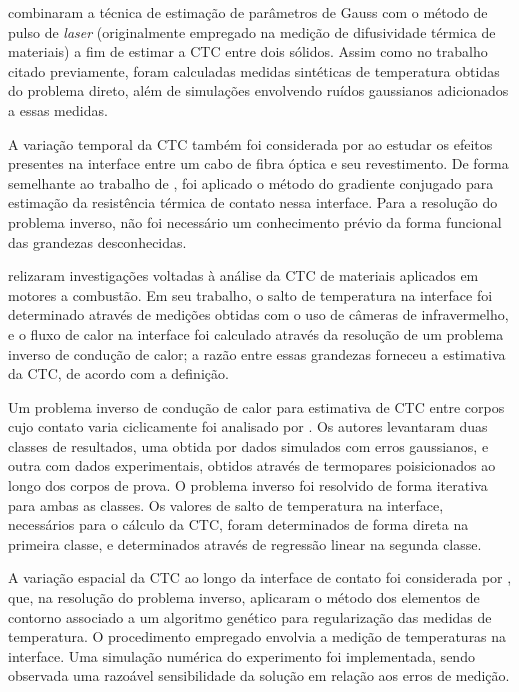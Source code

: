 \cite{artigo_milosevic} combinaram a técnica de estimação de parâmetros de Gauss com o método de pulso de \textit{laser} (originalmente empregado
na medição de difusividade térmica de materiais) a fim de estimar a CTC entre dois sólidos. Assim como no trabalho citado previamente, foram calculadas
medidas sintéticas de temperatura obtidas do problema direto, além de simulações envolvendo ruídos gaussianos adicionados a essas medidas.

A variação temporal da CTC também foi considerada por \cite{artigo_yang} ao estudar os efeitos presentes na interface entre um cabo de
fibra óptica e seu revestimento. De forma semelhante ao trabalho de \cite{artigo_huang}, foi aplicado o método do gradiente conjugado para estimação
da resistência térmica de contato nessa interface. Para a resolução do problema inverso, não foi necessário um conhecimento prévio da forma funcional das grandezas desconhecidas.

\cite{artigo_fieberg} relizaram investigações voltadas à análise da CTC de materiais aplicados em motores a combustão. Em seu trabalho, o salto de temperatura
na interface foi determinado através de medições obtidas com o uso de câmeras de infravermelho, e o fluxo de calor na interface foi calculado
através da resolução de um problema inverso de condução de calor; a razão entre essas grandezas forneceu a estimativa da CTC, de acordo
com a definição.   

Um problema inverso de condução de calor para estimativa de CTC entre corpos cujo contato varia ciclicamente foi analisado por \cite{artigo_shoj}.
Os autores levantaram duas classes de resultados, uma obtida por dados simulados com erros gaussianos, e outra com dados experimentais, obtidos através
de termopares poisicionados ao longo dos corpos de prova. O problema
inverso foi resolvido de forma iterativa para ambas as classes. Os valores de salto de temperatura na interface, necessários para o cálculo da CTC,
foram determinados de forma direta na primeira classe, e determinados através de regressão linear na segunda classe. 

A variação espacial da CTC ao longo da interface de contato foi considerada por \cite{artigo_gill}, que, na resolução do problema inverso, aplicaram
o método dos elementos de contorno \citep{livro_bem} associado a um algoritmo genético para regularização das medidas de temperatura. O procedimento empregado
envolvia a medição de temperaturas na interface. Uma simulação numérica do experimento foi implementada, sendo observada uma razoável sensibilidade
da solução em relação aos erros de medição. 

